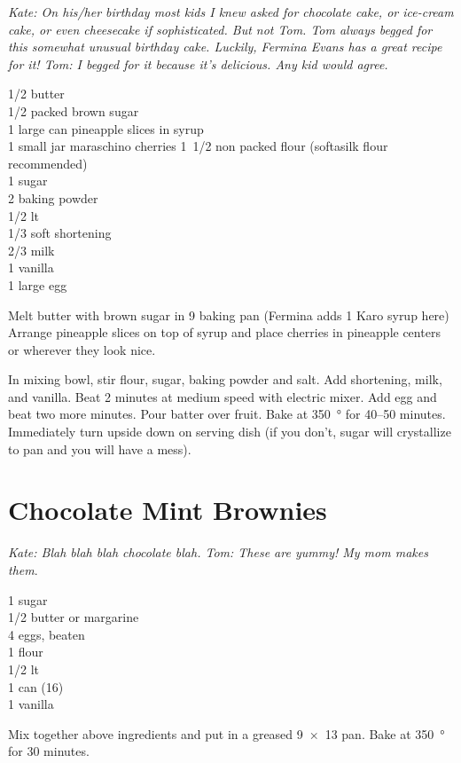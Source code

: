 \textit{Kate: On his/her birthday most kids I knew asked for chocolate cake,
  or ice-cream cake, or even cheesecake if sophisticated. But not Tom.  Tom
  always begged for this somewhat unusual birthday cake. Luckily, Fermina
  Evans has a great recipe for it!  Tom: I begged for it because it's
  delicious. Any kid would agree.}
\begin{ingredients}
  \SI{1/2}{\cup} butter \\
  \SI{1/2}{\cup} packed brown sugar \\
  1 large can pineapple slices in syrup \\
  1 small jar maraschino cherries
  \SI{1/2}[1]{\cup} non packed flour (softasilk flour recommended) \\
  \SI{1}{\cup} sugar \\
  \SI{2}{\teaspoon} baking powder \\
  \SI{1/2}{\teaspoon} lt \\
  \SI{1/3}{\cup} soft shortening \\
  \SI{2/3}{\cup} milk \\
  \SI{1}{\teaspoon} vanilla \\
  1 large egg
\end{ingredients}
Melt butter with brown sugar in \SI{9}{\inch} baking pan (Fermina adds
\SI{1}{\tblspoon} Karo syrup here) Arrange pineapple slices on top of syrup
and place cherries in pineapple centers or wherever they look nice.

In mixing bowl, stir flour, sugar, baking powder and salt. Add shortening,
milk, and vanilla. Beat 2 minutes at medium speed with electric mixer. Add egg
and beat two more minutes. Pour batter over fruit. Bake at \SI{350}{\degree}
for \numrange{40}{50} minutes. Immediately turn upside down on serving dish
(if you don't, sugar will crystallize to pan and you will have a mess).

\section{Chocolate Mint Brownies}

\textit{Kate: Blah blah blah chocolate blah.  Tom: These are yummy!  My mom
  makes them}.
\begin{ingredients}
  \SI{1}{\cup} sugar\\
  \SI{1/2}{\cup} butter or margarine\\
  4 eggs, beaten\\
  \SI{1}{\cup} flour\\
  \SI{1/2}{\teaspoon} lt\\
  1 can  (\SI{16}{\ounce})\\
  \SI{1}{\teaspoon} vanilla
\end{ingredients}
Mix together above ingredients and put in a greased \SI{9x13}{\inch} pan.
Bake at \SI{350}{\degree} for 30 minutes.

